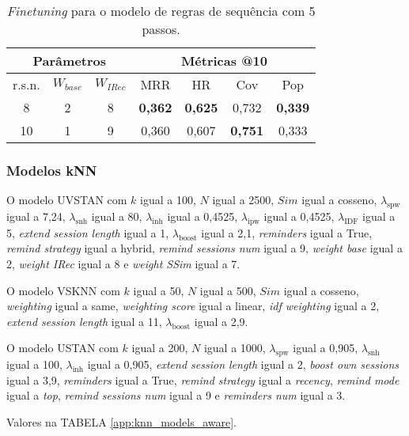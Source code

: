 \begin{table}
  \centering
  \begin{tabular}{|c|c|c|c|c|c|c|}
    \hline
      \multicolumn{3}{|c|}{Parâmetros} & \multicolumn{4}{c|}{Métricas @10} \\
      \hline
      r.s.n. & $W_{base}$ & $W_{IRec}$ & MRR & HR & Cov & Pop \\
      \hline
      8 & 2 & 8 & \textbf{0,362} & \textbf{0,625} & 0,732 & \textbf{0,339} \\
    \hline
     10 & 1 & 9 & 0,360 & 0,607 & \textbf{0,751} & 0,333 \\
     \hline
  \end{tabular}
  \caption{\textit{Finetuning} para o modelo de regras de sequência com 5 passos.}
  \label{opt:seq_rules_finetuning}
\end{table}

\subsubsection{Modelos kNN}
O modelo UVSTAN com $k$ igual a 100, $N$ igual a 2500, $Sim$ igual a cosseno,
$\lambda_{\text{spw}}$ igual a 7,24, $\lambda_{\text{snh}}$ igual a 80,
$\lambda_{\text{inh}}$ igual a 0,4525, $\lambda_{\text{ipw}}$ igual a 0,4525,
$\lambda_{\text{IDF}}$ igual a 5, \textit{extend session length} igual a 1,
$\lambda_{\text{boost}}$ igual a 2,1, \textit{reminders} igual a True,
\textit{remind strategy} igual a hybrid, \textit{remind sessions num} igual a 9,
\textit{weight base} igual a 2, \textit{weight IRec} igual a 8 e \textit{weight
SSim} igual a 7.

O modelo VSKNN com $k$ igual a 50, $N$ igual a 500, $Sim$ igual a cosseno,
\textit{weighting} igual a same, \textit{weighting score} igual a linear,
\textit{idf weighting} igual a 2, \textit{extend session length} igual a 11,
$\lambda_{\text{boost}}$ igual a 2,9.

O modelo USTAN com $k$ igual a 200, $N$ igual a 1000, $\lambda_{\text{spw}}$
igual a 0,905, $\lambda_{\text{snh}}$ igual a 100, $\lambda_{\text{inh}}$ igual a
0,905, \textit{extend session length} igual a 2, \textit{boost own sessions}
igual a 3,9, \textit{reminders} igual a True, \textit{remind strategy} igual a
\textit{recency}, \textit{remind mode} igual a \textit{top}, \textit{remind
sessions num} igual a 9 e \textit{reminders num} igual a 3.

Valores na TABELA \ref{app:knn_models_aware}.

